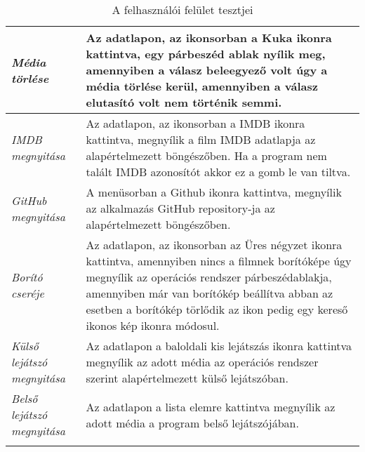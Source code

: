 \begin{center}
\begin{longtable}{ | p{} | p{} | }
        \emph{Média törlése}
		& Az adatlapon, az ikonsorban a Kuka ikonra kattintva, egy párbeszéd ablak nyílik meg, amennyiben a válasz beleegyező volt úgy a média törlése kerül, amennyiben a válasz elutasító volt nem történik semmi.
		\\ \hline

        \emph{IMDB megnyitása}
		& Az adatlapon, az ikonsorban a IMDB ikonra kattintva, megnyílik a film IMDB adatlapja az alapértelmezett böngészőben. Ha a program nem talált IMDB azonosítót akkor ez a gomb le van tiltva.
		\\ \hline

        \emph{GitHub megnyitása}
		& A menüsorban a Github ikonra kattintva, megnyílik az alkalmazás GitHub repository-ja az alapértelmezett böngészőben.
		\\ \hline

        \emph{Borító cseréje}
		& Az adatlapon, az ikonsorban az Üres négyzet ikonra kattintva, amennyiben nincs a filmnek borítóképe úgy megnyílik az operációs rendszer párbeszédablakja, amennyiben már van borítókép beállítva abban az esetben a borítókép törlődik az ikon pedig egy kereső ikonos kép ikonra módosul.
		\\ \hline

        \emph{Külső lejátszó megnyitása}
		& Az adatlapon a baloldali kis lejátszás ikonra kattintva megnyílik az adott média az operációs rendszer szerint alapértelmezett külső lejátszóban.
		\\ \hline

        \emph{Belső lejátszó megnyitása}
		& Az adatlapon a lista elemre kattintva megnyílik az adott média a program belső lejátszójában.
		\\ \hline

		\caption{A felhasználói felület tesztjei}
		\label{tab:ui_tests}
	\end{longtable}
\end{center}
